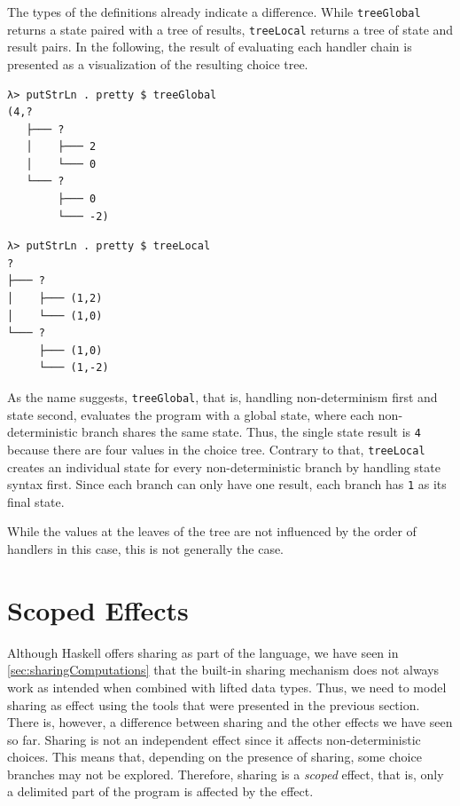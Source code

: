 \documentclass[a4paper, 11pt, fleqn, twoside, abstract=on]{scrreprt}
\newcommand{\hinl}[1]{\texttt{#1}}
\begin{document}
The types of the definitions already indicate a difference.
While \hinl{treeGlobal} returns a state paired with a tree of results, \hinl{treeLocal} returns a tree of state and result pairs.
In the following, the result of evaluating each handler chain is presented as a visualization of the resulting choice tree.

\vspace{0.32cm}

\begin{minipage}{.465 \linewidth}
\begin{verbatim}
λ> putStrLn . pretty $ treeGlobal
(4,?
   ├─── ?
   │    ├─── 2
   │    └─── 0
   └─── ?
        ├─── 0
        └─── -2)
\end{verbatim}
\end{minipage}
\hfill
\vline
\hfill
\begin{minipage}{.475 \linewidth}
\begin{verbatim}
λ> putStrLn . pretty $ treeLocal
?
├─── ?
│    ├─── (1,2)
│    └─── (1,0)
└─── ?
     ├─── (1,0)
     └─── (1,-2)
\end{verbatim}
\end{minipage}

\vspace{0.32cm}

As the name suggests, \hinl{treeGlobal}, that is, handling non-determinism first and state second, evaluates the program with a global state, where each non-deterministic branch shares the same state.
Thus, the single state result is \hinl{4} because there are four values in the choice tree.
Contrary to that, \hinl{treeLocal} creates an individual state for every non-deterministic branch by handling state syntax first.
Since each branch can only have one result, each branch has \hinl{1} as its final state.

While the values at the leaves of the tree are not influenced by the order of handlers in this case, this is not generally the case.

\section{Scoped Effects}
\label{sec:sharing}

Although Haskell offers sharing as part of the language, we have seen in \autoref{sec:sharingComputations} that the built-in sharing mechanism does not always work as intended when combined with lifted data types.
Thus, we need to model sharing as effect using the tools that were presented in the previous section.
There is, however, a difference between sharing and the other effects we have seen so far.
Sharing is not an independent effect since it affects non-deterministic choices.
This means that, depending on the presence of sharing, some choice branches may not be explored.
Therefore, sharing is a \textit{scoped} effect, that is, only a delimited part of the program is affected by the effect.
\end{document}
